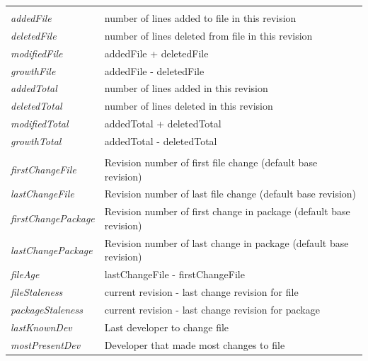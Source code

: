\begin{longtable}[c]{@{}ll@{}}
	\textit{}                   &                                                                    \\
	\textit{addedFile}          & number of lines added to file in this revision                     \\
	\textit{deletedFile}        & number of lines deleted from file in this revision                 \\
	\textit{modifiedFile}       & addedFile + deletedFile                                            \\
	\textit{growthFile}         & addedFile - deletedFile                                            \\
	\textit{addedTotal}         & number of lines added in this revision                             \\
	\textit{deletedTotal}       & number of lines deleted in this revision                           \\
	\textit{modifiedTotal}      & addedTotal + deletedTotal                                          \\
	\textit{growthTotal}        & addedTotal - deletedTotal                                          \\
	\textit{}                   &                                                                    \\
	\textit{firstChangeFile}    & Revision number of first file change (default base revision)       \\
	\textit{lastChangeFile}     & Revision number of last file change (default base revision)        \\
	\textit{firstChangePackage} & Revision number of first change in package (default base revision) \\
	\textit{lastChangePackage}  & Revision number of last change in package (default base revision)  \\
	\textit{fileAge}            & lastChangeFile - firstChangeFile                                   \\
	\textit{fileStaleness}      & current revision - last change revision for file                   \\
	\textit{packageStaleness}   & current revision - last change revision for package                \\
	\textit{lastKnownDev}       & Last developer to change file                                      \\
	\textit{mostPresentDev}     & Developer that made most changes to file                           \\* \bottomrule
\end{longtable}

